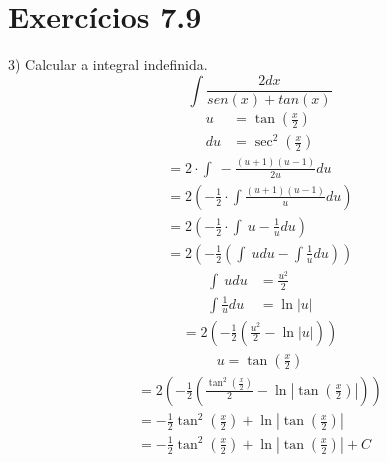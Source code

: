 \documentclass[a4paper,times,12pt]{article}
\begin{document}
\section{Exerc\'{i}cios 7.9}
\hspace*{+15pt} 3) Calcular a integral indefinida.
\[ \int \frac{2dx}{sen\left(x\right)+tan\left(x\right)} \]
\begin{align*}
	u&=\tan \left(\frac{x}{2}\right) \\
	du&=\sec ^2\left(\frac{x}{2}\right)
\end{align*}
\begin{gather*}
	=2\cdot \int \:-\frac{\left(u+1\right)\left(u-1\right)}{2u}du \\
	=2\left(-\frac{1}{2}\cdot \int \frac{\left(u+1\right)\left(u-1\right)}{u}du\right) \\
	=2\left(-\frac{1}{2}\cdot \int \:u-\frac{1}{u}du\right) \\
	=2\left(-\frac{1}{2}\left(\int \:udu-\int \frac{1}{u}du\right)\right)
\end{gather*}
\begin{align*}
	\int \:udu&=\frac{u^2}{2} \\
	\int \frac{1}{u}du&=\ln \left|u\right|
\end{align*}
\begin{gather*}
	=2\left(-\frac{1}{2}\left(\frac{u^2}{2}-\ln \left|u\right|\right)\right)
\end{gather*}
\begin{align*}
	u=\tan \left(\frac{x}{2}\right)
\end{align*}
\begin{gather*}
	=2\left(-\frac{1}{2}\left(\frac{\tan ^2\left(\frac{x}{2}\right)}{2}-\ln \left|\tan \left(\frac{x}{2}\right)\right|\right)\right) \\
	=-\frac{1}{2}\tan ^2\left(\frac{x}{2}\right)+\ln \left|\tan \left(\frac{x}{2}\right)\right| \\
	=-\frac{1}{2}\tan ^2\left(\frac{x}{2}\right)+\ln \left|\tan \left(\frac{x}{2}\right)\right|+C
\end{gather*}
\newpage
\end{document}
